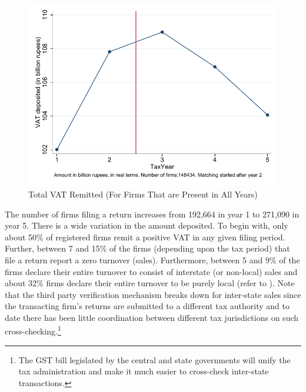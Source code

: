 \begin{figure}[t!] 
\includegraphics[width=.6\textwidth]{graphs/TotalVATDeposited_TotalCount5_Real.pdf}
\caption{Total VAT Remitted (For Firms That are Present in All Years)}
\label{fig:vatdeposited-alwayspresent}
\end{figure}

The number of firms filing a return increases from 192,664 in year 1 to 271,090 in year 5. There is a wide variation in the amount deposited. To begin with, only about 50\% of registered firms remit a positive VAT in any given filing period. Further, between 7 and 15\% of the firms (depending upon the tax period) that file a return report a zero turnover (sales). Furthermore, between 5 and 9\% of the firms declare their entire turnover to consist of interstate (or non-local) sales and about 32\% firms declare their entire turnover to be purely local (refer to ). Note that the third party verification mechanism breaks down for inter-state sales since the transacting firm's returns are submitted to a different tax authority and to date there has been little coordination between different tax jurisdictions on such cross-checking.\footnote{The GST bill legislated by the central and state governments will unify the tax administration and make it much easier to cross-check inter-state transactions.} 

